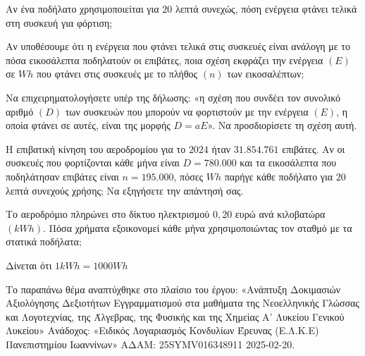 \begin{alist}
\item Αν ένα ποδήλατο χρησιμοποιείται για $20$ λεπτά συνεχώς, πόση ενέργεια φτάνει τελικά στη συσκευή για φόρτιση;
\item

\begin{rlist}
\item Αν υποθέσουμε ότι η ενέργεια που φτάνει τελικά στις συσκευές είναι ανάλογη με το πόσα εικοσάλεπτα ποδηλατούν οι επιβάτες, ποια σχέση εκφράζει την ενέργεια $(E)$ σε $\si{Wh}$ που φτάνει στις συσκευές με το πλήθος $(n)$ των εικοσαλέπτων;
\item Να επιχειρηματολογήσετε υπέρ της δήλωσης: «η σχέση που συνδέει τον συνολικό αριθμό $(D)$ των συσκευών που μπορούν να φορτιστούν με την ενέργεια $(E)$, η οποία φτάνει σε αυτές, είναι της μορφής $D = a E$». Να προσδιορίσετε τη σχέση αυτή.
\end{rlist}
\item

\begin{rlist}
\item Η επιβατική κίνηση του αεροδρομίου για το $2024$ ήταν $31.854.761$ επιβάτες. Αν οι συσκευές που φορτίζονται κάθε μήνα είναι $D = 780.000$ και τα εικοσάλεπτα που ποδηλάτησαν επιβάτες είναι $n = 195.000$, πόσες $\si{Wh}$ παρήγε κάθε ποδήλατο για $20\ $λεπτά συνεχούς χρήσης; Να εξηγήσετε την απάντησή σας.
\item Το αεροδρόμιο πληρώνει στο δίκτυο ηλεκτρισμού $0,20$ ευρώ ανά κιλοβατώρα $(\si{kWh})$. Πόσα χρήματα εξοικονομεί κάθε μήνα χρησιμοποιώντας τον σταθμό με τα στατικά ποδήλατα;

Δίνεται ότι $1\si{kWh} = 1000\si{Wh}$
\end{rlist}
\end{alist}
{\footnotesize Το παραπάνω θέμα αναπτύχθηκε στο πλαίσιο του έργου: «Ανάπτυξη Δοκιμασιών Αξιολόγησης Δεξιοτήτων Εγγραμματισμού στα μαθήματα της Νεοελληνικής Γλώσσας και Λογοτεχνίας, της Άλγεβρας, της Φυσικής και της Χημείας Α' Λυκείου Γενικού Λυκείου» Ανάδοχος: «Ειδικός Λογαριασμός Κονδυλίων Έρευνας (Ε.Λ.Κ.Ε) Πανεπιστημίου Ιωαννίνων» ΑΔΑΜ: 25SYMV016348911 2025-02-20.}

